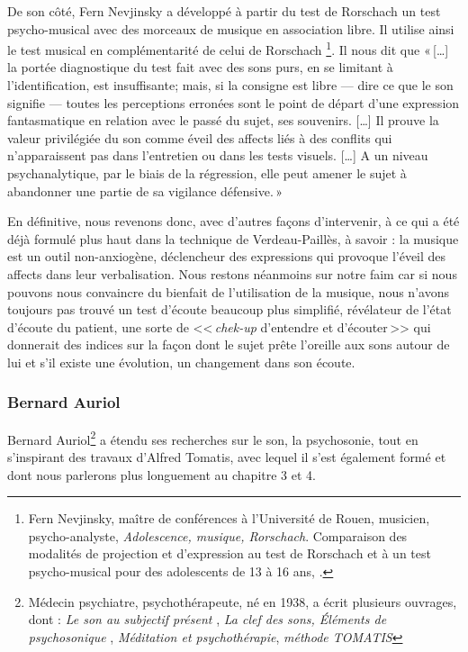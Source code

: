  De son côté, Fern Nevjinsky a développé à partir du  test de Rorschach un test psycho-musical avec des morceaux
de musique en association libre. Il utilise ainsi le test
musical en complémentarité de celui de Rorschach%
\footnote{Fern Nevjinsky, maître de conférences à l'Université de Rouen, musicien, psycho-analyste, \textsl{Adolescence, musique, Rorschach}. Comparaison des modalités de projection et d'expression au test de Rorschach et à un test psycho-musical pour des adolescents de 13 à 16 ans,
  \cite{nevjinsky:adolescence}.}. Il nous dit  que  «\,[\ldots] la
portée diagnostique du test fait avec des sons purs, en se limitant à
l'identification, est insuffisante; mais, si la consigne est libre ---
dire ce que le son signifie --- toutes les perceptions erronées sont
le point de départ d'une expression fantasmatique en relation avec le
passé du sujet, ses souvenirs. [\ldots] 
Il prouve  la valeur privilégiée du son comme éveil
des affects liés à des conflits qui n'apparaissent pas dans
l'entretien ou dans les tests visuels.  [\ldots] A un niveau
psychanalytique, par le biais de la régression, elle peut amener le sujet à abandonner une partie de sa vigilance défensive.\,»

En définitive, nous revenons donc, avec d'autres façons d'intervenir,
à ce qui a été déjà formulé plus haut dans la technique de
 Verdeau-Paillès, à savoir : la musique est un outil non-anxiogène, déclencheur des expressions qui provoque
l'éveil des affects dans  leur verbalisation. Nous restons néanmoins sur notre faim car si nous pouvons nous convaincre du bienfait de l'utilisation de la musique, nous n'avons toujours pas trouvé un test d'écoute beaucoup plus simplifié, révélateur de l'état d'écoute du patient, une sorte de <<\,\emph{chek-up} d'entendre et d'écouter\,>>
 qui donnerait des indices sur la façon dont le sujet prête l'oreille aux sons autour de lui et s'il existe une évolution, un changement dans son écoute.


\subsubsection{Bernard Auriol}

Bernard Auriol\footnote{Médecin psychiatre, psychothérapeute, 
	né en 1938, a écrit plusieurs ouvrages, dont : \textsl{Le son au subjectif présent} \cite{auriol:son}, \textsl{La clef des sons, Éléments de psychosonique} \cite{auriol:cle}, \textsl{Méditation et
  psychothérapie},  \emph{méthode TOMATIS}} 
a étendu ses recherches sur le son, la psychosonie, 
tout en s'inspirant des
travaux d'Alfred Tomatis, avec lequel il s'est également formé et dont nous parlerons plus longuement au chapitre 3 et 4.

